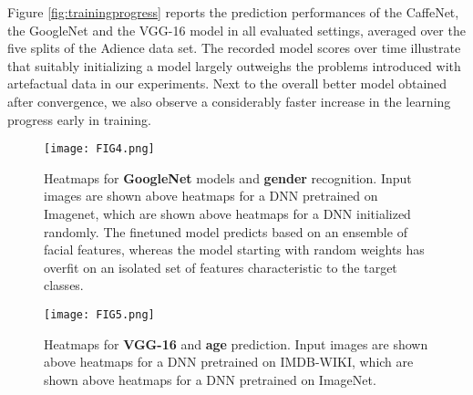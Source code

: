\documentclass[10pt,twocolumn,letterpaper]{article}
\begin{document}
Figure \ref{fig:trainingprogress} reports the prediction performances of the CaffeNet, the GoogleNet and the VGG-16 model in all evaluated settings, averaged over the five splits of the Adience data set. The recorded model scores over time illustrate that suitably initializing a model largely outweighs the problems introduced with artefactual data in our experiments. Next to the overall better model obtained after convergence, we also observe a considerably faster increase in the learning progress early in training.



\begin{figure}
\begin{center}
\texttt{[image: FIG4.png]}
\end{center}
\caption{Heatmaps for \textbf{GoogleNet} models and \textbf{gender} recognition. Input images are shown above heatmaps for a DNN pretrained on Imagenet, which are shown above heatmaps for a DNN initialized randomly. The finetuned model predicts based on an ensemble of facial features, whereas the model starting with random weights has overfit on an isolated set of features characteristic to the target classes.}
\label{fig:googlenetinitgender}
\end{figure}


\begin{figure}
\begin{center}
\texttt{[image: FIG5.png]}
\end{center}
\caption{Heatmaps for \textbf{VGG-16} and \textbf{age} prediction. Input images are shown above heatmaps for a DNN pretrained on IMDB-WIKI, which are shown above heatmaps for a DNN pretrained on ImageNet.}
\label{fig:vgginitage}
\end{figure}



\end{document}
